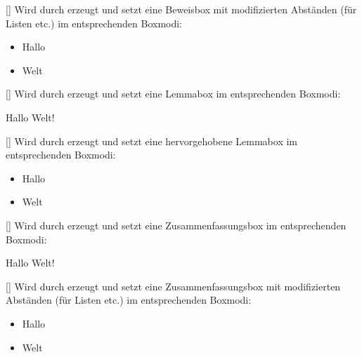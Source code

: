 %
%
%

[]
Wird durch  erzeugt und setzt eine Beweisbox mit modifizierten Abständen (für Listen etc.) im entsprechenden Boxmodi:
\begin{latex}
\begin{beweis*}[Hallo]
   \begin{itemize}
       \item Hallo
       \item Welt
   \end{itemize}
\end{beweis*}
\end{latex}

%
%
%

[]
Wird durch  erzeugt und setzt eine Lemmabox im entsprechenden Boxmodi:
\begin{latex}
\begin{lemma}[Hallo]
   Hallo Welt!
\end{lemma}
\end{latex} 

%
%
%

[]
Wird durch  erzeugt und setzt eine hervorgehobene Lemmabox im entsprechenden Boxmodi:
\begin{latex}
\begin{lemma*}[Hallo]
   \begin{itemize}
       \item Hallo
       \item Welt
   \end{itemize}
\end{lemma*}
\end{latex}

%
%
%

[]
Wird durch  erzeugt und setzt eine Zusammenfassungsbox im entsprechenden Boxmodi:
\begin{latex}
\begin{zusammenfassung}[Hallo]
   Hallo Welt!
\end{zusammenfassung}
\end{latex} 

%
%
%

[]
Wird durch  erzeugt und setzt eine Zusammenfassungsbox mit modifizierten Abständen (für Listen etc.) im entsprechenden Boxmodi:
\begin{latex}
\begin{zusammenfassung*}[Hallo]
   \begin{itemize}
       \item Hallo
       \item Welt
   \end{itemize}
\end{zusammenfassung*}
\end{latex}

